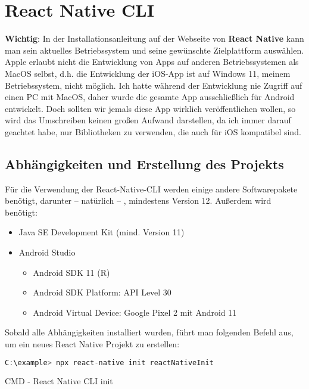 \section{React Native CLI}
\textbf{Wichtig}: In der Installationsanleitung auf der Webseite von \textbf{React Native} kann man sein
aktuelles Betriebssystem und seine gewünschte Zielplattform auswählen. Apple erlaubt nicht die
Entwicklung von Apps auf anderen Betriebssystemen als MacOS selbst, d.h. die Entwicklung der iOS-App
ist auf Windows 11, meinem Betriebssystem, nicht möglich. Ich hatte während der Entwicklung nie
Zugriff auf einen PC mit MacOS, daher wurde die gesamte App ausschließlich für Android entwickelt.
Doch sollten wir jemals diese App wirklich veröffentlichen wollen, so wird das Umschreiben keinen
großen Aufwand darstellen, da ich immer darauf geachtet habe, nur Bibliotheken zu verwenden, die
auch für iOS kompatibel sind.

\subsection{Abhängigkeiten und Erstellung des Projekts}
Für die Verwendung der React-Native-CLI werden einige andere Softwarepakete benötigt, darunter --
natürlich -- , mindestens Version 12. Außerdem wird benötigt:

\begin{itemize}
  \item Java SE Development Kit (mind. Version 11)
  \item Android Studio
  \begin{itemize}
    \item Android SDK 11 (R)
    \item Android SDK Platform: API Level 30
    \item Android Virtual Device: Google Pixel 2 mit Android 11
  \end{itemize}
\end{itemize}

Sobald alle Abhängigkeiten installiert wurden, führt man folgenden Befehl aus, um ein neues React
Native Projekt zu erstellen:

\begin{code}[htp]
\begin{lstlisting}[firstnumber=1,language=JavaScript, style=CMD]
C:\example> npx react-native init reactNativeInit
\end{lstlisting}
\caption{CMD - React Native CLI init}
\end{code}


